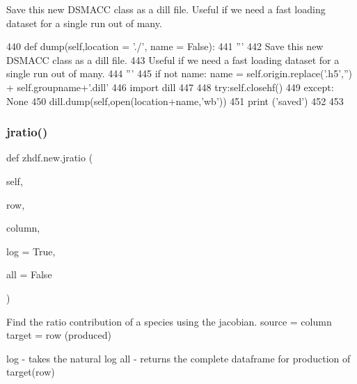 \begin{DoxyVerb}Save this new DSMACC class as a dill file.
Useful if we need a fast loading dataset for a single run out of many.
\end{DoxyVerb}
 
\begin{DoxyCode}
440     \textcolor{keyword}{def }dump(self,location = './', name = False):
441         \textcolor{stringliteral}{'''}
442 \textcolor{stringliteral}{        Save this new DSMACC class as a dill file.}
443 \textcolor{stringliteral}{        Useful if we need a fast loading dataset for a single run out of many.}
444 \textcolor{stringliteral}{        '''}
445         \textcolor{keywordflow}{if} \textcolor{keywordflow}{not} name: name = self.origin.replace(\textcolor{stringliteral}{'.h5'},\textcolor{stringliteral}{''})  + self.groupname+\textcolor{stringliteral}{'.dill'}
446         \textcolor{keyword}{import} dill
447 
448         \textcolor{keywordflow}{try}:self.closehf()
449         \textcolor{keywordflow}{except}: \textcolor{keywordtype}{None}
450         dill.dump(self,open(location+name,\textcolor{stringliteral}{'wb'}))
451         \textcolor{keywordflow}{print} (\textcolor{stringliteral}{'saved'})
452 
453 
\end{DoxyCode}
\mbox{\label{classzhdf_1_1new_a47eb4a577472f59215c79d2785c2588e}} 
\subsubsection{\texorpdfstring{jratio()}{jratio()}\hspace{0.1cm}{\footnotesize\ttfamily [1/2]}}
{\footnotesize\ttfamily def zhdf.\+new.\+jratio (\begin{DoxyParamCaption}\item[{}]{self,  }\item[{}]{row,  }\item[{}]{column,  }\item[{}]{log = {\ttfamily True},  }\item[{}]{all = {\ttfamily False} }\end{DoxyParamCaption})}

\begin{DoxyVerb}Find the ratio contribution of a species using the jacobian.
source = column
target = row (produced)

log - takes the natural log
all - returns the complete dataframe for production of target(row)
\end{DoxyVerb}
 
